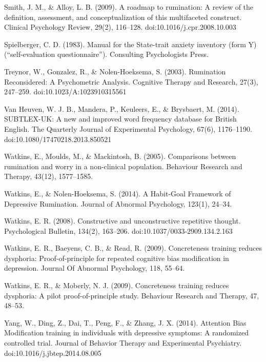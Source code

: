 \documentclass[man,a4paper,biblatex]{apa6}
\begin{document}
Smith, J. M., \& Alloy, L. B. (2009). A roadmap to rumination: A review of the definition, assessment, and conceptualization of this multifaceted construct. Clinical Psychology Review, 29(2), 116--128. doi:10.1016/j.cpr.2008.10.003

Spielberger, C. D. (1983). Manual for the State-trait anxiety inventory (form Y) (``self-evaluation questionnaire''). Consulting Psychologists Press.

Treynor, W., Gonzalez, R., \& Nolen-Hoeksema, S. (2003). Rumination Reconsidered: A Psychometric Analysis. Cognitive Therapy and Research, 27(3), 247--259. doi:10.1023/A:1023910315561

Van Heuven, W. J. B., Mandera, P., Keuleers, E., \& Brysbaert, M. (2014). SUBTLEX-UK: A new and improved word frequency database for British English. The Quarterly Journal of Experimental Psychology, 67(6), 1176--1190. doi:10.1080/17470218.2013.850521

Watkins, E., Moulds, M., \& Mackintosh, B. (2005). Comparisons between rumination and worry in a non-clinical population. Behaviour Research and Therapy, 43(12), 1577--1585.

Watkins, E., \& Nolen-Hoeksema, S. (2014). A Habit-Goal Framework of Depressive Rumination. Journal of Abnormal Psychology, 123(1), 24--34.

Watkins, E. R. (2008). Constructive and unconstructive repetitive thought. Psychological Bulletin, 134(2), 163--206. doi:10.1037/0033-2909.134.2.163

Watkins, E. R., Baeyens, C. B., \& Read, R. (2009). Concreteness training reduces dysphoria: Proof-of-principle for repeated cognitive bias modification in depression. Journal Of Abnormal Psychology, 118, 55--64.

Watkins, E. R., \& Moberly, N. J. (2009). Concreteness training reduces dysphoria: A pilot proof-of-principle study. Behaviour Research and Therapy, 47, 48--53.

Yang, W., Ding, Z., Dai, T., Peng, F., \& Zhang, J. X. (2014). Attention Bias Modification training in individuals with depressive symptoms: A randomized controlled trial. Journal of Behavior Therapy and Experimental Psychiatry. doi:10.1016/j.jbtep.2014.08.005
\printbibliography
\end{document}
